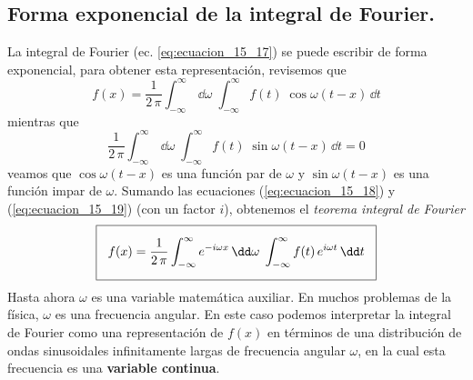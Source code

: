 \subsection{Forma exponencial de la integral de Fourier.}
La integral de Fourier (ec. \ref{eq:ecuacion_15_17}) se puede escribir de forma exponencial, para obtener esta representación, revisemos que
\begin{equation}
f(x) =  \dfrac{1}{2 \, \pi} \int_{- \infty}^{\infty} \,\dd \omega \; \int_{-\infty}^{\infty} f(t) \; \cos \omega (t - x) \, \dd t
\label{eq:ecuacion_15_18}
\end{equation}
mientras que
\begin{equation}
\dfrac{1}{2 \, \pi} \int_{-\infty}^{\infty} \, \dd \omega \; \int_{-\infty}^{\infty} f(t) \; \sin \omega (t - x) \, \dd t = 0
\label{eq:ecuacion_15_19}
\end{equation}
veamos que $ \cos \omega (t - x)$ es una función par de $\omega$ y $\sin \omega (t - x)$ es una función impar de $\omega$. Sumando las ecuaciones (\ref{eq:ecuacion_15_18}) y (\ref{eq:ecuacion_15_19}) (con un factor $i$), obtenemos el \emph{teorema integral de Fourier}
\begin{equation}
\setlength{\fboxsep}{3\fboxsep}\boxed{
f(x) = \dfrac{1}{2 \, \pi} \int_{-\infty}^{\infty} e^{-i \omega x} \, \dd \omega \; \int_{-\infty}^{\infty} f(t) \, e^{i \omega t} \, \dd t }
\label{eq:ecuacion_15_20}
\end{equation}
Hasta ahora $\omega$ es una variable matemática auxiliar. En muchos problemas de la física, $\omega$ es una frecuencia angular. En este caso podemos interpretar la integral de Fourier como una representación de $f(x)$ en términos de una distribución de ondas sinusoidales infinitamente largas de frecuencia angular $\omega$, en la cual esta frecuencia es una \textbf{variable continua}.
